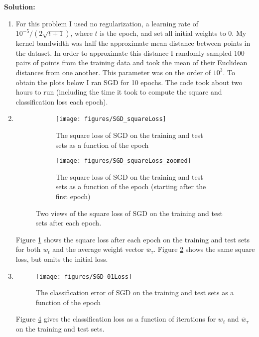 \documentclass{article}
\newcommand{\solution}{\textbf{\vskip 0.2cm \large Solution:\\}}
\begin{document}
\solution

\begin{enumerate}
	\item For this problem I used no regularization, a learning rate of $10^{-5} / (2\sqrt{t+1})$, where $t$ is the epoch, and set all initial weights to 0. My kernel bandwidth was half the approximate mean distance between points in the dataset. In order to approximate this distance I randomly sampled 100 pairs of points from the training data and took the mean of their Euclidean distances from one another. This parameter was on the order of $10^3$. To obtain the plots below I ran SGD for 10 epochs. The code took about two hours to run (including the time it took to compute the square and classification loss each epoch).

	\item
	\begin{figure}
		\centering
		\begin{subfigure}{0.49\textwidth}
			\centering
			\texttt{[image: figures/SGD\_squareLoss]}
			\caption{The square loss of SGD on the training and test sets as a function of the epoch}
			\label{fig:SGD_squareLoss_overview}
		\end{subfigure}
		\begin{subfigure}{0.49\textwidth}
			\centering
			\texttt{[image: figures/SGD\_squareLoss\_zoomed]}
			\caption{The square loss of SGD on the training and test sets as a function of the epoch (starting after the first epoch)}
			\label{fig:SGD_squareLoss_zoomed}
		\end{subfigure}
		\caption{Two views of the square loss of SGD on the training and test sets after each epoch.}
		\label{fig:SGD_squareloss}
	\end{figure}
	Figure \ref{fig:SGD_squareLoss_overview} shows the square loss after each epoch on the training and test sets for both $w_t$ and the average weight vector $\overline w_\tau$. Figure \ref{fig:SGD_squareLoss_zoomed} shows the same square loss, but omits the initial loss.

	\item
	\begin{figure}
		\centering
		\texttt{[image: figures/SGD\_01Loss]}
		\caption{The classification error of SGD on the training and test sets as a function of the epoch} 
		\label{fig:figures/SGD_01Loss}
	\end{figure}
	Figure \ref{fig:figures/SGD_01Loss} gives the classification loss as a function of iterations for $w_t$ and $\overline w_\tau$ on the training and test sets.


\end{enumerate}
\end{document}
